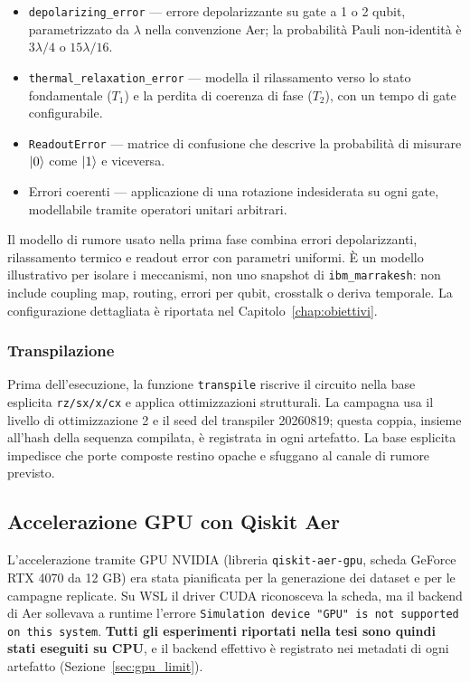 \begin{onehalfspace}
\begin{itemize}
    \item \texttt{depolarizing\_error} — errore depolarizzante su gate a 1 o 2 qubit, parametrizzato da $\lambda$ nella convenzione Aer; la probabilità Pauli non-identità è $3\lambda/4$ o $15\lambda/16$.
    \item \texttt{thermal\_relaxation\_error} — modella il rilassamento verso lo stato fondamentale ($T_1$) e la perdita di coerenza di fase ($T_2$), con un tempo di gate configurabile.
    \item \texttt{ReadoutError} — matrice di confusione che descrive la probabilità di misurare $\ket{0}$ come $\ket{1}$ e viceversa.
    \item Errori coerenti — applicazione di una rotazione indesiderata su ogni gate, modellabile tramite operatori unitari arbitrari.
\end{itemize}

Il modello di rumore usato nella prima fase combina errori depolarizzanti, rilassamento termico e readout error con parametri uniformi. È un modello illustrativo per isolare i meccanismi, non uno snapshot di \texttt{ibm\_marrakesh}: non include coupling map, routing, errori per qubit, crosstalk o deriva temporale. La configurazione dettagliata è riportata nel Capitolo~\ref{chap:obiettivi}.

\subsubsection{Transpilazione}

Prima dell'esecuzione, la funzione \texttt{transpile} riscrive il circuito nella base esplicita \texttt{rz/sx/x/cx} e applica ottimizzazioni strutturali. La campagna usa il livello di ottimizzazione 2 e il seed del transpiler 20260819; questa coppia, insieme all'hash della sequenza compilata, è registrata in ogni artefatto. La base esplicita impedisce che porte composte restino opache e sfuggano al canale di rumore previsto.

\subsection{Accelerazione GPU con Qiskit Aer}
\label{sec:gpu}

L'accelerazione tramite \ac{GPU} NVIDIA (libreria \texttt{qiskit-aer-gpu}, scheda
GeForce RTX 4070 da 12 GB) era stata pianificata per la generazione dei dataset e per
le campagne replicate. Su \ac{WSL} il driver CUDA riconosceva la scheda, ma il backend
di Aer sollevava a runtime l'errore \texttt{Simulation device "GPU" is not supported on
this system}. \textbf{Tutti gli esperimenti riportati nella tesi sono quindi stati
eseguiti su \ac{CPU}}, e il backend effettivo è registrato nei metadati di ogni
artefatto (Sezione~\ref{sec:gpu_limit}).


\end{onehalfspace}
